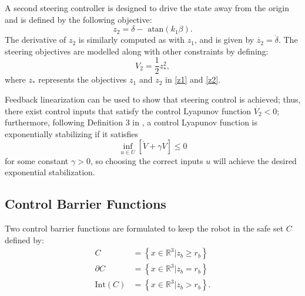 \documentclass[conference]{IEEEtran}
\begin{document}
A second steering controller is designed to drive the state away from the origin and is defined by the following objective: \begin{equation}z_2=\delta-\text{ atan}(k_1\beta).\label{z2}\end{equation}
The derivative of $z_2$ is similarly computed as with $z_1$, and is given by $\dot{z_2} = \dot{\delta}.$ The steering objectives are modelled along with other constraints by defining: 
\begin{equation} V_2 = \frac{1}{2}  z_*^2, \label{v2}\end{equation}
where $z_*$ represents the objectives $z_1$ and $z_2$ in \eqref{z1} and \eqref{z2}.

Feedback linearization can be used to show that steering control is achieved; thus, there exist control inputs that satisfy the control Lyapunov function $\dot{V_2}<0$; furthermore, following Definition 3 in \cite{ames2014esclf}, a control Lyapunov function is exponentially stabilizing if it satisfies
\begin{equation}
\inf_{u\in U}\left[ \dot{V}+\gamma V \right] \leq 0
\label{eq:esclf}
\end{equation}
for some constant $\gamma >0$, so choosing the correct inputs $u$ will achieve the desired exponential stabilization. 


\subsection{Control Barrier Functions}
Two control barrier functions are formulated to keep the robot in the safe set $C$ defined by:
\begin{align}
C &= \left\lbrace x \in \mathbb{R}^3 | z_b\geq r_b\right\rbrace\\
\partial C &= \left\lbrace x \in \mathbb{R}^3 | z_b=r_b\right\rbrace\\
\text{Int}(C) &= \left\lbrace x \in \mathbb{R}^3 | z_b > r_b\right\rbrace.
\end{align}
\end{document}
